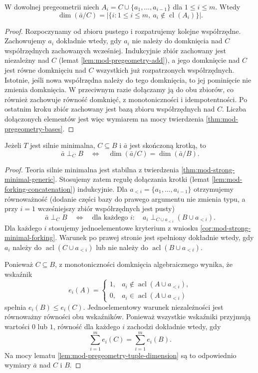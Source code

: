 \begin{lemat}
\label{lem:mod-pregeometry-tuple-dimension}
W dowolnej pregeometrii niech
$A_i=C\cup\{a_1,\ldots,a_{i-1}\}$ dla $1\leq i\leq m$.
Wtedy
\[
\dim(\bar a/C)=
\bigl|\{i:1\leq i\leq m,\ 
a_i\notin\operatorname{cl}(A_i)\}\bigr|.
\]
\end{lemat}
\begin{proof}
Rozpoczynamy od zbioru pustego i rozpatrujemy
kolejne współrzędne. Zachowujemy $a_i$
dokładnie wtedy, gdy $a_i$ nie należy
do domknięcia nad $C$ współrzędnych
zachowanych wcześniej.
Indukcyjnie zbiór zachowany jest niezależny
nad $C$ (lemat \ref{lem:mod-pregeometry-add}),
a jego domknięcie nad $C$ jest równe
domknięciu nad $C$ wszystkich już
rozpatrzonych współrzędnych.
Istotnie, jeśli nowa współrzędna należy
do tego domknięcia, to jej pominięcie
nie zmienia domknięcia. W przeciwnym
razie dołączamy ją do obu zbiorów,
co również zachowuje równość domknięć,
z monotoniczności i idempotentności.
Po ostatnim kroku zbiór zachowany jest
bazą zbioru współrzędnych nad $C$.
Liczba dołączonych elementów jest więc
wymiarem na mocy twierdzenia
\ref{thm:mod-pregeometry-bases}.
\end{proof}

\begin{twierdzenie}
\label{thm:mod-strong-minimal-tuple-forking}
Jeżeli $T$ jest silnie minimalna, $C\subseteq B$
i $\bar a$ jest skończoną krotką, to
\[
\bar a\mathrel{\perp_C}B
\quad\Longleftrightarrow\quad
\dim(\bar a/C)=\dim(\bar a/B).
\]
\end{twierdzenie}
\begin{proof}
Teoria silnie minimalna jest stabilna
z twierdzenia \ref{thm:mod-strong-minimal-generic}.
Stosujemy zatem regułę dołączania krotki
(lemat \ref{lem:mod-forking-concatenation})
indukcyjnie. Dla $a_{<i}=\{a_1,\ldots,a_{i-1}\}$
otrzymujemy równoważność (dodanie części bazy
do prawego argumentu nie zmienia typu, a przy
$i=1$ wcześniejszy zbiór współrzędnych jest pusty)
\[
\bar a\mathrel{\perp_C}B
\quad\Longleftrightarrow\quad
\text{dla każdego }i:\quad
 a_i\mathrel{\perp_{C\cup a_{<i}}}(B\cup a_{<i}).
\]
Dla każdego $i$ stosujemy jednoelementowe
kryterium z wniosku
\ref{cor:mod-strong-minimal-forking}.
Warunek po prawej stronie jest spełniony
dokładnie wtedy, gdy $a_i$ należy do
$\operatorname{acl}(C\cup a_{<i})$ lub
nie należy do $\operatorname{acl}(B\cup a_{<i})$.

Ponieważ $C\subseteq B$, z monotoniczności
domknięcia algebraicznego wynika, że
wskaźnik
\[
e_i(A)=
\begin{cases}
1,&a_i\notin\operatorname{acl}(A\cup a_{<i}),\\
0,&a_i\in\operatorname{acl}(A\cup a_{<i})
\end{cases}
\]
spełnia $e_i(B)\leq e_i(C)$.
Jednoelementowy warunek niezależności
jest równoważny równości obu wskaźników.
Ponieważ wszystkie wskaźniki przyjmują
wartości $0$ lub $1$, równość dla każdego
$i$ zachodzi dokładnie wtedy, gdy
\[
\sum_{i=1}^{m}e_i(C)=\sum_{i=1}^{m}e_i(B).
\]
Na mocy lematu \ref{lem:mod-pregeometry-tuple-dimension}
są to odpowiednio wymiary $\bar a$ nad $C$ i $B$.
\end{proof}

